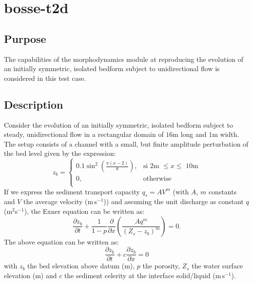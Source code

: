 \chapter{bosse-t2d}
%

%
\section{Purpose}
The capabilities of the morphodynamics module at reproducing the evolution of an initially symmetric, isolated bedform subject to unidirectional flow is considered in this test case.

\section{Description}
Consider the evolution of an initially symmetric, isolated bedform subject to steady, unidirectional flow in a rectangular domain of $16$m long and $1$m width.
The setup consists of a channel with a small, but finite amplitude perturbation of the bed level given by the expression:
\begin {equation}
z_b=\left\{
\begin{array}{ll}
\displaystyle
0.1\sin^2\left(\frac{\pi (x-2)}{8}\right), & \text{si 2m $\leq x \leq$ 10m}  \\
\displaystyle
 0, & \text{otherwise} \label{eq:topographie_initiale} \\
\end{array}
\right.
\end{equation}
If we express the sediment transport capacity $q_s = AV^m$ (with $A$, $m$ constants and $V$ the average velocity (m\,s$^{-1}$)) and assuming the unit discharge as constant $q$ (m$^2$s$^{-1}$), the Exner equation can be written as:
\begin{equation}
\frac{\partial z_b}{\partial t}+\frac{1}{1-p}\frac{\partial}{\partial x} \left(\frac{Aq^m}{ (Z_s-z_b)^m}\right)=0.
\end{equation}
The above equation can be written as:
\begin{equation}
\frac{\partial z_b}{\partial t}+c\frac{\partial z_b}{\partial x}=0
\end{equation}\label{eq:evolution_fond}
with $z_b$ the bed elevation above datum (m), $p$ the porosity, $Z_s$ the water surface elevation (m) and $c$ the sediment celerity at the interface solid/liquid (m\,s$^{-1}$).

